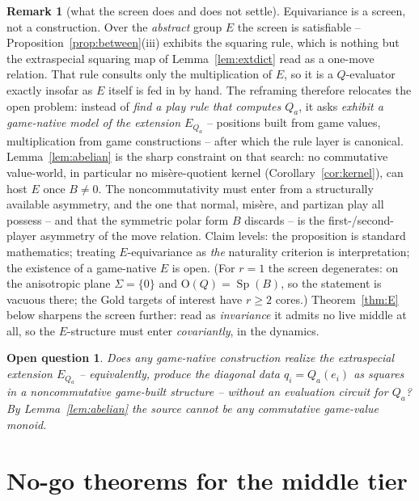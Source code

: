 \documentclass[11pt]{article}
\theoremstyle{plain}
\newtheorem*{question}{Open question}
\theoremstyle{definition}
\newtheorem{remark}{Remark}
\newcommand{\Sp}{\operatorname{Sp}}
\newcommand{\Orth}{\mathrm{O}}
\begin{document}
\begin{remark}[what the screen does and does not settle]\label{rem:screen}
Equivariance is a screen, not a construction. Over the \emph{abstract}
group $E$ the screen is satisfiable -- Proposition~\ref{prop:between}(iii)
exhibits the squaring rule, which is nothing but the extraspecial squaring
map of Lemma~\ref{lem:extdict} read as a one-move relation. That rule
consults only the multiplication of $E$, so it is a $Q$-evaluator exactly
insofar as $E$ itself is fed in by hand. The reframing therefore relocates
the open problem: instead of \emph{find a play rule that computes $Q_a$},
it asks \emph{exhibit a game-native model of the extension $E_{Q_a}$} --
positions built from game values, multiplication from game constructions --
after which the rule layer is canonical. Lemma~\ref{lem:abelian} is the
sharp constraint on that search: no commutative value-world, in particular
no misère-quotient kernel (Corollary~\ref{cor:kernel}), can host $E$ once
$B\neq0$. The noncommutativity must enter from a structurally available
asymmetry, and the one that normal, misère, and partizan play all possess
-- and that the symmetric polar form $B$ discards -- is the
first-/second-player asymmetry of the move relation. Claim
levels: the proposition is standard mathematics; treating
$E$-equivariance as \emph{the} naturality criterion is interpretation;
the existence of a game-native $E$ is open. (For $r=1$ the screen degenerates:
on the anisotropic plane $\Sigma=\{0\}$ and $\Orth(Q)=\Sp(B)$,
so the statement is vacuous there; the Gold targets of interest have
$r\geq2$ cores.) Theorem~\ref{thm:E} below sharpens the screen further:
read as \emph{invariance} it admits no live middle at all, so the
$E$-structure must enter \emph{covariantly}, in the dynamics.
\end{remark}

\begin{question}
Does any game-native construction realize the extraspecial extension
$E_{Q_a}$ -- equivalently, produce the diagonal data $q_i=Q_a(e_i)$ as
squares in a noncommutative game-built structure -- without an evaluation
circuit for $Q_a$? By Lemma~\ref{lem:abelian} the source cannot be any
commutative game-value monoid.
\end{question}

\section{No-go theorems for the middle tier}\label{sec:nogos}
\end{document}
